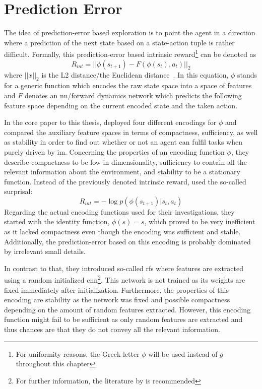 \documentclass[draft,final]{vutinfth} %
\newcommand{\p}[1]{see p. #1}
\begin{document}
    \section{Prediction Error}\label{sec:prediction-error}

    The idea of prediction-error based exploration is to point the agent in a direction where a prediction of the next state based on a state-action tuple is rather difficult.
    Formally, this prediction-error based intrinsic reward\footnote{For uniformity reasons, the Greek letter $\phi$ will be used instead of $g$ throughout this chapter} can be denoted as
    \begin{equation}
        R_{int}=||\phi(s_{t+1})-F(\phi(s_t),a_t)||_2
    \end{equation}
    where $||x||_2$ is the L2 distance/the Euclidean distance~\citep{aubret_survey_2019}.
    In this equation, $\phi$ stands for a generic function which encodes the raw state space into a space of features and $F$ denotes an \gls{nn}/forward dynamics network which predicts the following feature space depending on the current encoded state and the taken action.

    In the core paper to this thesis, \citet{burda_large-scale_2018-1} deployed four different encodings for $\phi$ and compared the auxiliary feature spaces in terms of compactness, sufficiency, as well as stability in order to find out whether or not an agent can fulfil tasks when purely driven by \gls{im}.
    Concerning the properties of an encoding function $\phi$, they describe compactness to be low in dimensionality, sufficiency to contain all the relevant information about the environment, and stability to be a stationary function.
    Instead of the previously denoted intrinsic reward, \citet{burda_large-scale_2018-1} used the so-called surprisal:
    \begin{equation}
        R_{int}=-\log p(\phi(s_{t+1})|s_t,a_t)
    \end{equation}
    Regarding the actual encoding functions used for their investigations, they started with the identity function, $\phi(s)=s$, which proved to be very inefficient as it lacked compactness even though the encoding was sufficient and stable.
    Additionally, the prediction-error based on this encoding is probably dominated by irrelevant small details.

    In contrast to that, they introduced so-called \glspl{rf} where features are extracted using a random initialized \gls{cnn}\footnote{For further information, the literature by \citet[\p{40ff}]{aggarwal_neural_2018} is recommended}.
    This network is not trained as its weights are fixed immediately after initialization.
    Furthermore, the properties of this encoding are stability as the network was fixed and possible compactness depending on the amount of random features extracted.
    However, this encoding function might fail to be sufficient as only random features are extracted and thus chances are that they do not convey all the relevant information.
\end{document}
